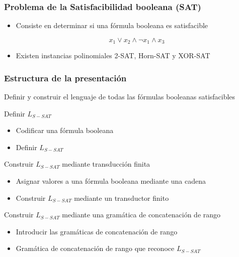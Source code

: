 \documentclass{beamer}
\begin{document}
\begin{frame}
    \frametitle{Problema de la Satisfacibilidad booleana (SAT)}
    
    \begin{itemize}
        \item Consiste en determinar si una fórmula booleana es satisfacible
              \begin{Large}
                  $$x_1\vee x_2 \wedge \neg x_1 \wedge x_3$$
              \end{Large}
              \pause
        \item Existen instancias polinomiales 2-SAT, Horn-SAT y XOR-SAT
    \end{itemize}
\end{frame}

\begin{frame}
    \frametitle{Estructura de la presentación}
    
    Definir y construir el lenguaje de todas las fórmulas booleanas satisfacibles   
    
    \pause
    
    \begin{block}{Definir $L_{S-SAT}$}
        \begin{itemize}
            \item Codificar una fórmula booleana
            \item Definir $L_{S-SAT}$
        \end{itemize}
    \end{block}
    
    \pause
    
    \begin{block}{Construir $L_{S-SAT}$ mediante transducción finita}
        \begin{itemize}
            \item Asignar valores a una fórmula booleana mediante una cadena
            \item Construir $L_{S-SAT}$ mediante un transductor finito
        \end{itemize}
    \end{block}
    
    \pause
    
    \begin{block}{Construir $L_{S-SAT}$ mediante una gramática de concatenación de rango}
        \begin{itemize}
            \item Introducir las gramáticas de concatenación de rango
            \item Gramática de concatenación de rango que reconoce $L_{S-SAT}$
        \end{itemize}
    \end{block}
\end{frame}
\end{document}
